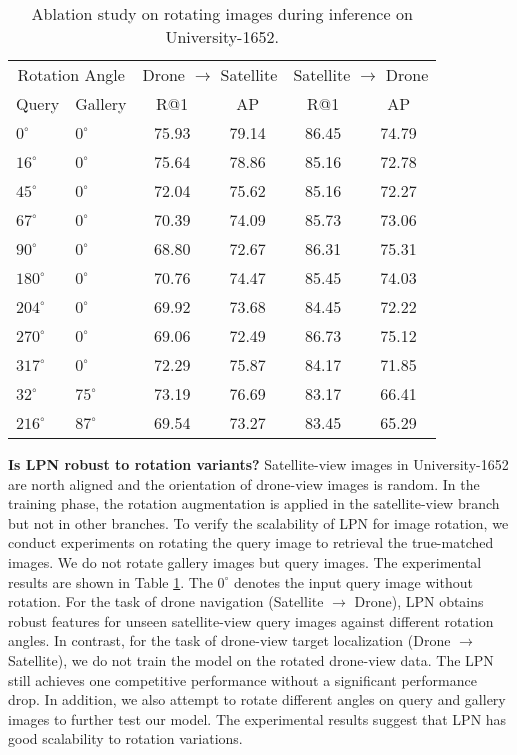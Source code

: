 \documentclass[journal]{IEEEtran}
\begin{document}
\setlength{\tabcolsep}{8pt}
\begin{table}
\small
\caption{Ablation study on rotating images during inference on University-1652. 
}
\begin{center}
\begin{tabular}{ll|cc|cc}
\hline
\multicolumn{2}{c|}{Rotation Angle}& \multicolumn{2}{c|}{Drone $\rightarrow$ Satellite} & \multicolumn{2}{c}{Satellite $\rightarrow$ Drone}\\
  Query & Gallery & R@1 & AP & R@1 & AP\\
\shline
$0^\circ$ & $0^\circ$ & 75.93 & 79.14 & 86.45 & 74.79 \\
$16^\circ$ & $0^\circ$ & 75.64 & 78.86 & 85.16 & 72.78 \\
$45^\circ$ & $0^\circ$ & 72.04 & 75.62 & 85.16 & 72.27 \\
$67^\circ$ & $0^\circ$ & 70.39 & 74.09 & 85.73 & 73.06 \\
$90^\circ$ & $0^\circ$ & 68.80 & 72.67 & 86.31 & 75.31 \\
$180^\circ$ & $0^\circ$ & 70.76 & 74.47 & 85.45 & 74.03 \\
$204^\circ$ & $0^\circ$ & 69.92 & 73.68 & 84.45 & 72.22 \\
$270^\circ$ & $0^\circ$ & 69.06 & 72.49 & 86.73 & 75.12 \\
$317^\circ$ & $0^\circ$ & 72.29 & 75.87 & 84.17 & 71.85 \\
$32^\circ$ & $75^\circ$ & 73.19 & 76.69 & 83.17 & 66.41 \\
$216^\circ$ & $87^\circ$ & 69.54 & 73.27 & 83.45 & 65.29 \\
\hline
\end{tabular}
\end{center}
\label{table:Rotation}
\end{table}

\textbf{Is LPN robust to rotation variants?}
Satellite-view images in University-1652 are north aligned and the orientation of drone-view images is random. In the training phase, the rotation augmentation is applied in the satellite-view branch but not in other branches. To verify the scalability of LPN for image rotation, we conduct experiments on rotating the query image to retrieval the true-matched images. We do not rotate gallery images but query images. The experimental results are shown in Table \ref{table:Rotation}. The $0^\circ$ denotes the input query image without rotation. For the task of drone navigation (Satellite $\rightarrow$ Drone), LPN obtains robust features for unseen satellite-view query images against different rotation angles. In contrast, for the task of drone-view target localization (Drone $\rightarrow$ Satellite), we do not train the model on the rotated drone-view data. The LPN still achieves one competitive performance without a significant performance drop. In addition, we also attempt to rotate different angles on query and gallery images to further test our model. The experimental results suggest that LPN has good scalability to rotation variations.
\end{document}
